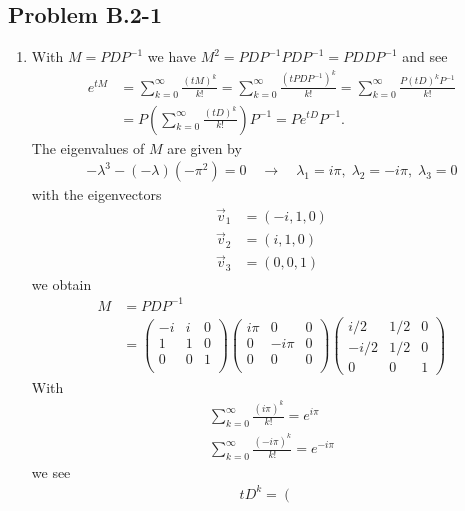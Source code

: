 \documentclass[../main.tex]{subfiles}
\begin{document}
\subsection{Problem B.2-1}
\begin{enumerate}
\item
With $M=PDP^{-1}$ we have $M^2=PDP^{-1}PDP^{-1}=PDDP^{-1}$ and see
\begin{align}
    e^{tM}&=\sum_{k=0}^\infty \frac{(tM)^k}{k!}=\sum_{k=0}^\infty \frac{(tPDP^{-1})^k}{k!}=\sum_{k=0}^\infty \frac{P(tD)^kP^{-1}}{k!}\\
    &=P\left(\sum_{k=0}^\infty \frac{(tD)^k}{k!}\right)P^{-1}=Pe^{tD}P^{-1}.
\end{align}
The eigenvalues of $M$ are given by
\begin{align}
    -\lambda^3-(-\lambda)(-\pi^2)=0\quad\rightarrow\quad\lambda_1=i\pi,\;\lambda_2=-i\pi,\;\lambda_3= 0
\end{align}
with the eigenvectors
\begin{align}
    \vec{v}_1&=(-i,1,0)\\
    \vec{v}_2&=(i,1,0)\\
    \vec{v}_3&=(0,0,1)
\end{align}
we obtain
\begin{align}
M&=PDP^{-1}\\
&=\left(
\begin{array}{ccc}
-i& i & 0 \\
1 & 1 & 0 \\
0 & 0 & 1 \\
\end{array}
\right)
\left(
\begin{array}{ccc}
 i\pi & 0 & 0 \\
 0 & -i\pi & 0 \\
 0 & 0 & 0 \\
\end{array}
\right)
\left(
\begin{array}{ccc}
  i/2 & 1/2 & 0 \\
 -i/2 & 1/2 & 0 \\
 0    & 0   & 1
\end{array}
\right)
\end{align}
With
\begin{align}
\sum_{k=0}^\infty \frac{(i\pi)^k}{k!}=e^{i\pi}\\
\sum_{k=0}^\infty \frac{(-i\pi)^k}{k!}=e^{-i\pi}
\end{align}
we see
\begin{align}
 tD^k=\left(
\begin{array}{ccc}

\end{array}
\end{align}
\end{enumerate}
\end{document}
